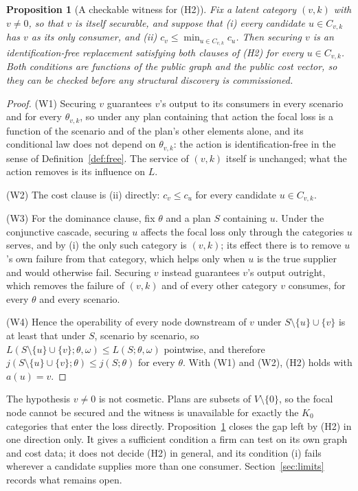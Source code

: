 \documentclass[pdflatex,sn-mathphys-num]{sn-jnl}
\theoremstyle{thmstyleone}
\newtheorem{proposition}[theorem]{Proposition}
\theoremstyle{thmstyletwo}
\theoremstyle{thmstylethree}
\begin{document}
\begin{proposition}[A checkable witness for (H2)]\label{prop:witness}
Fix a latent category $(v,k)$ with $v\ne0$, so that $v$ is itself securable,
and suppose that (i) every candidate $u\in C_{v,k}$ has $v$ as its only
consumer, and (ii) $c_v\le\min_{u\in C_{v,k}}c_u$. Then securing $v$ is an identification-free replacement
satisfying both clauses of (H2) for every $u\in C_{v,k}$. Both conditions are
functions of the public graph and the public cost vector, so they can be
checked before any structural discovery is commissioned.
\end{proposition}

\begin{proof}
(W1) Securing $v$ guarantees $v$'s output to its consumers in every scenario
and for every $\theta_{v,k}$, so under any plan containing that action the
focal loss is a function of the scenario and of the plan's other elements
alone, and its conditional law does not depend on $\theta_{v,k}$: the action is
identification-free in the sense of Definition~\ref{def:free}. The service of
$(v,k)$ itself is unchanged; what the action removes is its influence on $L$.

\noindent(W2) The cost clause is (ii) directly: $c_v\le c_u$ for every
candidate $u\in C_{v,k}$.

\noindent(W3) For the dominance clause, fix $\theta$ and a plan $S$ containing
$u$. Under the conjunctive cascade, securing $u$ affects the focal loss only
through the categories $u$ serves, and by (i) the only such category is
$(v,k)$; its effect there is to remove $u$'s own failure from that category,
which helps only when $u$ is the true supplier and would otherwise fail.
Securing $v$ instead guarantees $v$'s output outright, which removes the
failure of $(v,k)$ and of every other category $v$ consumes, for every
$\theta$ and every scenario.

\noindent(W4) Hence the operability of every node downstream of $v$ under
$S\setminus\{u\}\cup\{v\}$ is at least that under $S$, scenario by scenario,
so $L(S\setminus\{u\}\cup\{v\};\theta,\omega)\le L(S;\theta,\omega)$
pointwise, and therefore $j(S\setminus\{u\}\cup\{v\};\theta)\le j(S;\theta)$
for every $\theta$. With (W1) and (W2), (H2) holds with $a(u)=v$.
\end{proof}

The hypothesis $v\ne0$ is not cosmetic. Plans are subsets of
$V\setminus\{0\}$, so the focal node cannot be secured and the witness is
unavailable for exactly the $K_0$ categories that enter the loss directly.
Proposition~\ref{prop:witness} closes the gap left by (H2) in one direction
only. It gives a sufficient condition a firm can test on its own graph and
cost data; it does not decide (H2) in general, and its condition (i) fails
wherever a candidate supplies more than one consumer.
Section~\ref{sec:limits} records what remains open.
\end{document}
